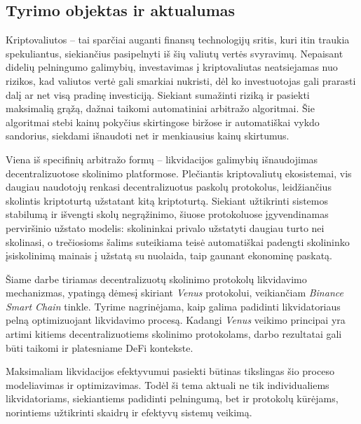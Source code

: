 \documentclass[]{VUMIFTemplateClass}
\begin{document}
\subsection*{Tyrimo objektas ir aktualumas}
Kriptovaliutos – tai sparčiai auganti finansų technologijų sritis, kuri itin traukia spekuliantus, siekiančius pasipelnyti iš šių valiutų vertės svyravimų. Nepaisant didelių pelningumo galimybių, investavimas į kriptovaliutas neatsiejamas nuo rizikos, kad valiutos vertė gali smarkiai nukristi, dėl ko investuotojas gali prarasti dalį ar net visą pradinę investiciją. Siekiant sumažinti riziką ir pasiekti maksimalią grąžą, dažnai taikomi automatiniai arbitražo algoritmai. Šie algoritmai stebi kainų pokyčius skirtingose biržose ir automatiškai vykdo sandorius, siekdami išnaudoti net ir menkiausius kainų skirtumus.

Viena iš specifinių arbitražo formų – likvidacijos galimybių išnaudojimas decentralizuotose skolinimo platformose. Plečiantis kriptovaliutų ekosistemai, vis daugiau naudotojų renkasi decentralizuotus paskolų protokolus, leidžiančius skolintis kriptoturtą užstatant kitą kriptoturtą. Siekiant užtikrinti sistemos stabilumą ir išvengti skolų negrąžinimo, šiuose protokoluose įgyvendinamas perviršinio užstato modelis: skolininkai privalo užstatyti daugiau turto nei skolinasi, o trečiosioms šalims suteikiama teisė automatiškai padengti skolininko įsiskolinimą mainais į užstatą su nuolaida, taip gaunant ekonominę paskatą.

Šiame darbe tiriamas decentralizuotų skolinimo protokolų likvidavimo mechanizmas, ypatingą dėmesį skiriant \textit{Venus} protokolui, veikiančiam \textit{Binance Smart Chain} tinkle. Tyrime nagrinėjama, kaip galima padidinti likvidatoriaus pelną optimizuojant likvidavimo procesą. Kadangi \textit{Venus} veikimo principai yra artimi kitiems decentralizuotiems skolinimo protokolams, darbo rezultatai gali būti taikomi ir platesniame DeFi kontekste.

Maksimaliam likvidacijos efektyvumui pasiekti būtinas tikslingas šio proceso modeliavimas ir optimizavimas. Todėl ši tema aktuali ne tik individualiems likvidatoriams, siekiantiems padidinti pelningumą, bet ir protokolų kūrėjams, norintiems užtikrinti skaidrų ir efektyvų sistemų veikimą.

\end{document}
